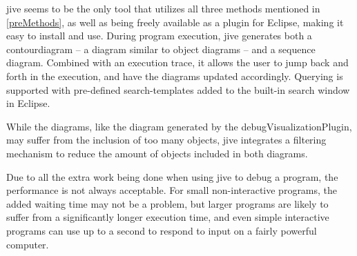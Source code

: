 \Gls{jive} seems to be the only tool that utilizes all three methods mentioned in \autoref{preMethods}, as well as being freely available as a plugin for Eclipse, making it easy to install and use.
During program execution, \gls{jive} generates both a \gls{contourdiagram} \cite{Jayaraman1996} -- a diagram similar to object diagrams -- and a sequence diagram.
Combined with an execution trace, it allows the user to jump back and forth in the execution, and have the diagrams updated accordingly.
Querying is supported with pre-defined search-templates added to the built-in search window in Eclipse.

While the diagrams, like the diagram generated by the \gls{debugVisualizationPlugin}, may suffer from the inclusion of too many objects, \gls{jive} integrates a filtering mechanism to reduce the amount of objects included in both diagrams.

Due to all the extra work being done when using \gls{jive} to debug a program, the performance is not always acceptable.
For small non-interactive programs, the added waiting time may not be a problem, but larger programs are likely to suffer from a significantly longer execution time, and even simple interactive programs can use up to a second to respond to input on a fairly powerful computer.






